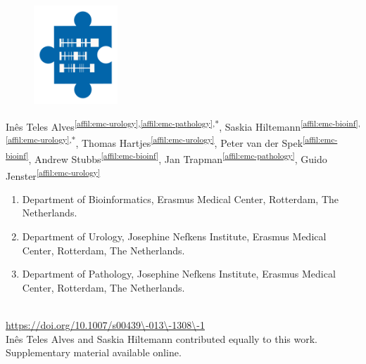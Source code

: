 \setcounter{NAT@ctr}{-1}
\chapter*{}

\begin{figure}[t!]
\centering
\includegraphics[height=10em]{frontmatter/images/chapter-header-fusion.png}
\end{figure}
\vspace{-4cm}

Inês Teles Alves\textsuperscript{\ref{affil:emc-urology},\ref{affil:emc-pathology},*},
Saskia Hiltemann\textsuperscript{\ref{affil:emc-bioinf},\ref{affil:emc-urology},*},
Thomas Hartjes\textsuperscript{\ref{affil:emc-urology}},
Peter van der Spek\textsuperscript{\ref{affil:emc-bioinf}},
Andrew Stubbs\textsuperscript{\ref{affil:emc-bioinf}},
Jan Trapman\textsuperscript{\ref{affil:emc-pathology}},
Guido Jenster\textsuperscript{\ref{affil:emc-urology}}

\small
\begin{enumerate}
\itemsep-0.5em
\item Department of Bioinformatics, Erasmus Medical Center, Rotterdam, The Netherlands.\label{affil:emc-bioinf}
\item Department of Urology, Josephine Nefkens Institute, Erasmus Medical Center, Rotterdam, The Netherlands.\label{affil:emc-urology}
\item Department of Pathology, Josephine Nefkens Institute, Erasmus Medical Center, Rotterdam, The Netherlands.\label{affil:emc-pathology}
\end{enumerate}


{\color{chaptergrey}{Published in: Human Genetics}} \\
{\color{chaptergrey}{DOI:}} \url{https://doi.org/10.1007/s00439\-013\-1308\-1} \\
{\color{chaptergrey}{*:}} Inês Teles Alves and Saskia Hiltemann contributed equally to this work.\\
Supplementary material available online. \\

